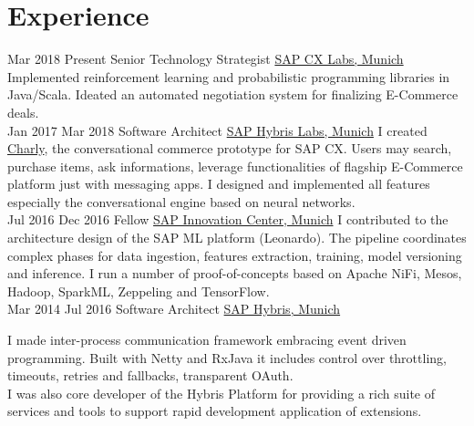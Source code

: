 \documentclass[letterpaper]{twentysecondcv} %
\begin{document}
\makeprofile %


\section{Experience}

\begin{twenty} %
\twentyitem
    	{Mar 2018}
		{Present}
        {Senior Technology Strategist}
        {\href{http://cx.sap.com/}{SAP CX Labs, Munich}}
        {}
        {
    		Implemented reinforcement learning and probabilistic programming libraries in Java/Scala. Ideated an automated negotiation system for finalizing E-Commerce deals.
	    }
        \\
\twentyitem
    	{Jan 2017}
		{Mar 2018}
        {Software Architect}
        {\href{http://cx.sap.com/}{SAP Hybris Labs, Munich}}
        {}
        {
        I created \href{http://charly.hybris.com/}{Charly}, the conversational commerce prototype for SAP CX. Users may search, purchase items, ask informations, leverage functionalities of flagship E-Commerce platform just with messaging apps.
      I designed and implemented all features especially the conversational engine based on neural networks.
      }
        \\
	\twentyitem
    	{Jul 2016}
		{Dec 2016}
        {Fellow}
        {\href{https://icn.sap.com/}{SAP Innovation Center, Munich}}
        {}
        {
        {
        I contributed to the architecture design of the SAP ML platform (Leonardo). The pipeline coordinates complex phases for data ingestion, features extraction, training,
      model versioning and inference. I run a number of proof-of-concepts based on Apache NiFi, Mesos, Hadoop, SparkML, Zeppeling and TensorFlow.
        }
        }
    \\
    \twentyitem
   		{Mar 2014}
		{Jul 2016}
        {Software Architect}
        {\href{http://www.hybris.com}{SAP Hybris, Munich}}
        {}
        {
        {
        I made inter-process communication framework embracing event driven programming. Built with Netty and RxJava it includes control over throttling, timeouts, retries and fallbacks, transparent OAuth.
        \\
        I was also core developer of the Hybris Platform for providing a rich suite of services and tools to support rapid development application of extensions. 

}}
\end{twenty}
\end{document}

